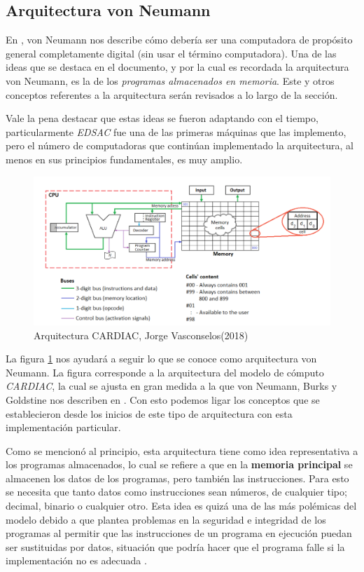 \documentclass[letterpaper,12pt,oneside]{book}
\begin{document}
		\subsection{Arquitectura von Neumann}
		
		En \cite{von_neumann_papers_1987}, von Neumann nos describe cómo debería ser una computadora de propósito general completamente digital (sin usar el 
		término computadora). Una de las ideas que se destaca en el documento, y por la cual es recordada la arquitectura von Neumann, es la
		de los \textit{programas almacenados en memoria}. Este y otros conceptos referentes a la arquitectura serán revisados
		a lo largo de la sección.
		
		Vale la pena destacar que estas ideas se fueron adaptando con el tiempo, particularmente \textit{EDSAC} fue una de las primeras máquinas
		que las implemento, pero el número de computadoras que continúan implementado la arquitectura, al menos en sus principios fundamentales, es	
		muy amplio.
		
		\begin{figure}[h]
			\includegraphics[scale=0.3]{media/Arquitectura_CARDIAC.png}
			\caption{Arquitectura CARDIAC, Jorge Vasconselos(2018) }%
			\label{fig:Arq_CARDIAC}
		\end{figure}
		
		La figura \ref{fig:Arq_CARDIAC} nos ayudará a seguir lo que
		se conoce como arquitectura von Neumann. La figura corresponde a la arquitectura del modelo de cómputo  \textit{CARDIAC}, la cual
		se ajusta en gran medida a la que von Neumann, Burks y Goldstine nos describen en \cite{von_neumann_papers_1987}.
		Con esto podemos ligar los conceptos que se establecieron
		desde los inicios de este tipo de arquitectura con esta implementación particular.
		
		
		Como se mencionó al principio, esta arquitectura tiene
		como idea representativa a los programas almacenados, lo cual se refiere a que en la \textbf{memoria principal} se almacenen los datos de
		los programas, pero también las instrucciones. Para esto se necesita que tanto datos como instrucciones sean números, de cualquier
		tipo; decimal, binario o cualquier otro.
		 Esta idea es quizá una de las más polémicas del modelo debido a que plantea problemas en la
		seguridad e integridad de los programas al permitir que las instrucciones de un programa en ejecución puedan ser sustituidas por datos,
		situación que
		podría hacer que el programa falle si la implementación no es adecuada \cite{von_neumann_papers_1987}.
\end{document}

